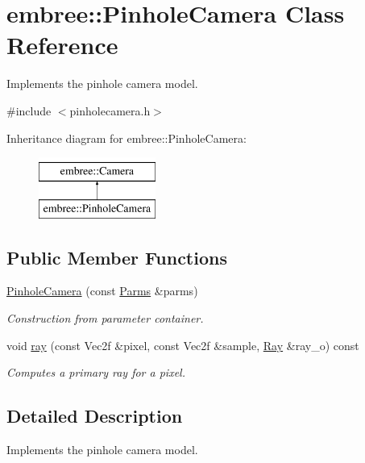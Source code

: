 \hypertarget{classembree_1_1_pinhole_camera}{
\section{embree::PinholeCamera Class Reference}
\label{classembree_1_1_pinhole_camera}
}


Implements the pinhole camera model.  




{\ttfamily \#include $<$pinholecamera.h$>$}

Inheritance diagram for embree::PinholeCamera:\begin{figure}[H]
\begin{center}
\leavevmode
\includegraphics[height=2.000000cm]{classembree_1_1_pinhole_camera}
\end{center}
\end{figure}
\subsection*{Public Member Functions}
\begin{DoxyCompactItemize}
\item 
\hyperlink{classembree_1_1_pinhole_camera_ac5ff4e2585006995449a9fe9acf83b03}{PinholeCamera} (const \hyperlink{classembree_1_1_parms}{Parms} \&parms)
\begin{DoxyCompactList}\small\item\em Construction from parameter container. \item\end{DoxyCompactList}\item 
void \hyperlink{classembree_1_1_pinhole_camera_a0118a538d8bfe698ca79ae672c313e8b}{ray} (const Vec2f \&pixel, const Vec2f \&sample, \hyperlink{structembree_1_1_ray}{Ray} \&ray\_\-o) const 
\begin{DoxyCompactList}\small\item\em Computes a primary ray for a pixel. \item\end{DoxyCompactList}\end{DoxyCompactItemize}


\subsection{Detailed Description}
Implements the pinhole camera model. 

